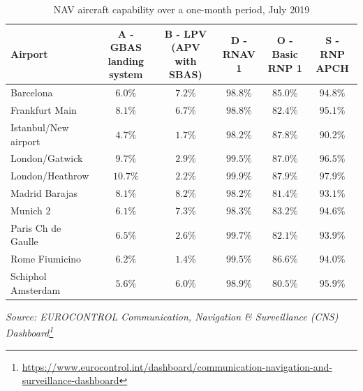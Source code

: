 \documentclass[
  11pt,
  a4paper,
]{book}
\DeclareRobustCommand{\href}[2]{#2\footnote{\url{#1}}}
\begin{document}
\hypertarget{tbl-nav-flight_month}{}
\setlength{\LTpost}{0mm}
\begin{longtable}{lccccc}
\caption{\label{tbl-nav-flight_month}NAV aircraft capability over a one-month period, July 2019 }\tabularnewline

\toprule
Airport & A - GBAS landing system & B - LPV (APV with SBAS) & D - RNAV 1 & O - Basic RNP 1 & S - RNP APCH \\ 
\midrule
Barcelona & $6.0\%$ & $7.2\%$ & $98.8\%$ & $85.0\%$ & $94.8\%$ \\ 
Frankfurt Main & $8.1\%$ & $6.7\%$ & $98.8\%$ & $82.4\%$ & $95.1\%$ \\ 
Istanbul/New airport & $4.7\%$ & $1.7\%$ & $98.2\%$ & $87.8\%$ & $90.2\%$ \\ 
London/Gatwick & $9.7\%$ & $2.9\%$ & $99.5\%$ & $87.0\%$ & $96.5\%$ \\ 
London/Heathrow & $10.7\%$ & $2.2\%$ & $99.9\%$ & $87.9\%$ & $97.9\%$ \\ 
Madrid Barajas & $8.1\%$ & $8.2\%$ & $98.2\%$ & $81.4\%$ & $93.1\%$ \\ 
Munich 2 & $6.1\%$ & $7.3\%$ & $98.3\%$ & $83.2\%$ & $94.6\%$ \\ 
Paris Ch de Gaulle & $6.5\%$ & $2.6\%$ & $99.7\%$ & $82.1\%$ & $93.9\%$ \\ 
Rome Fiumicino & $6.2\%$ & $1.4\%$ & $99.5\%$ & $86.6\%$ & $94.0\%$ \\ 
Schiphol Amsterdam & $5.6\%$ & $6.0\%$ & $98.9\%$ & $80.5\%$ & $95.9\%$ \\ 
\bottomrule
\end{longtable}
\begin{minipage}{\linewidth}
\emph{Source: \href{https://www.eurocontrol.int/dashboard/communication-navigation-and-surveillance-dashboard}{EUROCONTROL Communication, Navigation \& Surveillance (CNS) Dashboard}}\\
\end{minipage}
\end{document}
